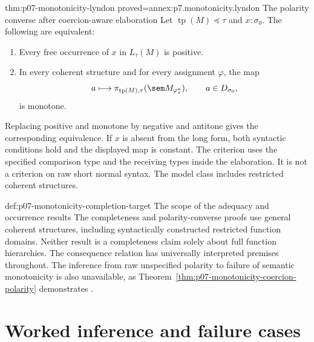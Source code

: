 \begin{hbtheorem}{thm:p07-monotonicity-lyndon}
 {proved=annex:p7.monotonicity.lyndon}
 {The polarity converse after coercion-aware elaboration}
Let \(\operatorname{tp}(M)\preceq\tau\) and \(x:\sigma_0\).
The following are equivalent:
\begin{enumerate}
\item Every free occurrence of \(x\) in \(L_\tau(M)\) is positive.
\item In every coherent structure and for every assignment \(\varphi\),
      the map
\[
 a\longmapsto
 \pi_{\operatorname{tp}(M),\tau}
      (\sem M_{\varphi_x^a}),\qquad a\in D_{\sigma_0},
\]
      is monotone.
\end{enumerate}
Replacing positive and monotone by negative and antitone gives the
corresponding equivalence. If \(x\) is absent from the long form, both
syntactic conditions hold and the displayed map is constant.
The criterion uses the specified comparison type and the receiving types
inside the elaboration. It is not a criterion on raw short normal syntax.
The model class includes restricted coherent structures.
\end{hbtheorem}

\begin{hbwarning}{def:p07-monotonicity-completion-target}
 {The scope of the adequacy and occurrence results}
The completeness and polarity-converse proofs use general coherent
structures, including syntactically constructed restricted function
domains. Neither result is a completeness claim solely about full
function hierarchies. The consequence relation has universally interpreted
premises throughout. The inference from raw unspecified polarity to
failure of semantic monotonicity is also unavailable, as
Theorem~\ref{thm:p07-monotonicity-coercion-polarity} demonstrates
\cite[Sections 8--10]{IcardMossTune2017Monotonicity}.
\end{hbwarning}

\section{Worked inference and failure cases}

